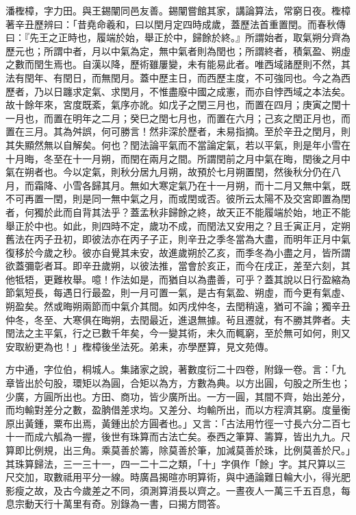 \begin{pinyinscope}
潘檉樟，字力田。與王錫闡同邑友善。錫闡嘗館其家，講論算法，常窮日夜。檉樟著辛丑歷辨曰：「昔堯命羲和，曰以閏月定四時成歲，蓋歷法首重置閏。而春秋傳曰：『先王之正時也，履端於始，舉正於中，歸餘於終。』所謂始者，取氣朔分齊為歷元也；所謂中者，月以中氣為定，無中氣者則為閏也；所謂終者，積氣盈、朔虛之數而閏生焉也。自漢以降，歷術雖屢變，未有能易此者。唯西域諸歷則不然，其法有閏年、有閏日，而無閏月。蓋中歷主日，而西歷主度，不可強同也。今之為西歷者，乃以日躔求定氣、求閏月，不惟盡廢中國之成憲，而亦自悖西域之本法矣。故十餘年來，宮度既紊，氣序亦訛。如戊子之閏三月也，而置在四月；庚寅之閏十一月也，而置在明年之二月；癸巳之閏七月也，而置在六月；己亥之閏正月也，而置在三月。其為舛誤，何可勝言！然非深於歷者，未易指摘。至於辛丑之閏月，則其失顯然無以自解矣。何也？閏法論平氣而不當論定氣，若以平氣，則是年小雪在十月晦，冬至在十一月朔，而閏在兩月之間。所謂閏前之月中氣在晦，閏後之月中氣在朔者也。今以定氣，則秋分居九月朔，故預於七月朔置閏，然後秋分仍在八月，而霜降、小雪各歸其月。無如大寒定氣乃在十一月朔，而十二月又無中氣，既不可再置一閏，則是同一無中氣之月，而或閏或否。彼所云太陽不及交宮即置為閏者，何獨於此而自背其法乎？蓋孟秋非歸餘之終，故天正不能履端於始，地正不能舉正於中也。如此，則四時不定，歲功不成，而閏法又安用之？且壬寅正月，定朔舊法在丙子丑初，即彼法亦在丙子子正，則辛丑之季冬當為大盡，而明年正月中氣復移於今歲之秒。彼亦自覺其未安，故進歲朔於乙亥，而季冬為小盡之月，皆所謂欲蓋彌彰者耳。即辛丑歲朔，以彼法推，當會於亥正，而今在戌正，差至六刻，其他牴牾，更難枚舉。噫！作法如是，而猶自以為盡善，可乎？蓋其說以日行盈縮為節氣短長，每遇日行最盈，則一月可置一氣，是古有氣盈、朔虛，而今更有氣虛、朔盈矣。然或晦朔兩節而中氣介其間。如丙戌仲冬，去閏稍遠，猶可不論；獨辛丑仲冬，冬至、大寒俱在晦朔，去閏最近，進退無據。茍且遷就，有不勝其弊者。夫閏法之主平氣，行之已數千年矣，今一變其術，未久而輒窮，至於無可如何，則又安取紛更為也！」檉樟後坐法死。弟耒，亦學歷算，見文苑傳。

方中通，字位伯，桐城人。集諸家之說，著數度衍二十四卷，附錄一卷。言：「九章皆出於句股，環矩以為圓，合矩以為方，方數為典。以方出圓，句股之所生也；少廣，方圓所出也。方田、商功，皆少廣所出。一方一圓，其間不齊，始出差分，而均輸對差分之數，盈朒借差求均。又差分、均輸所出，而以方程濟其窮。度量衡原出黃鍾，粟布出焉，黃鍾出於方圓者也。」又言：「古法用竹徑一寸長六分二百七十一而成六觚為一握，後世有珠算而古法亡矣。泰西之筆算、籌算，皆出九九。尺算即比例規，出三角。乘莫善於籌，除莫善於筆，加減莫善於珠，比例莫善於尺。」其珠算歸法，三一三十一，四一二十二之類，「十」字俱作「餘」字。其尺算以三尺交加，取數祗用平分一線。時廣昌揭暄亦明算術，與中通論難日輪大小，得光肥影瘦之故，及古今歲差之不同，須測算消長以齊之。一晝夜人一萬三千五百息，每息宗動天行十萬里有奇。別錄為一書，曰揭方問答。


\end{pinyinscope}
